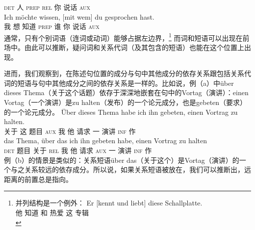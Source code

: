      \textsc{det} 人 \spacebr{}\textsc{prep} \textsc{rel} 你 说话 \textsc{aux}\\
\ex 
\gll Ich möchte wissen, [mit wem] du gesprochen hast.\\
     我 想 知道 \spacebr{}\textsc{prep} 谁 你 说话 \textsc{aux}\\
\zl
通常，只有个别词语（连词或动词）能够占据左边界，\footnote{%
 并列结构是一个例外：
\ea
\gll Er [kennt und liebt] diese Schallplatte.\\
     他 \spacebr{}知道 和 热爱 这 专辑\\
\z
} 
而词和短语可以出现在前场中。由此可以推断，疑问词和关系代词（及其包含的短语）也能在这个位置上出现。

进而，我们观察到，在陈述句\vf 位置的成分与句中其他成分的依存关系跟包括关系代词的短语与句中其他成分之间的依存关系是一样的。比如说，例（a）中über dieses Thema（关于这个话题）依存于深深地嵌套在句中的Vortag（演讲）：einen Vortag（一个演讲）是zu halten（发布）的一个论元成分，也是gebeten（要求）的一个论元成分。
\eal
\ex 
\gll Über dieses Thema habe ich ihn gebeten, einen Vortrag zu halten.\\
      关于 这 题目  \textsc{aux} 我   他 请求    一     演讲   \textsc{inf} 作\\
\ex 
\gll das Thema, über das ich ihn gebeten habe, einen Vortrag zu halten\\
     \textsc{det} 题目  关于  \textsc{rel} 我 他 请求  \textsc{aux} 一 演讲 \textsc{inf} 作\\
\zl
例（b）的情景是类似的：关系短语über das（关于这个）是Vortag（演讲）的一个与之关系较远的依存成分。所以说，如果关系短语被放在\vf，我们可以推断出，远距离的前置总是指向\vf。

